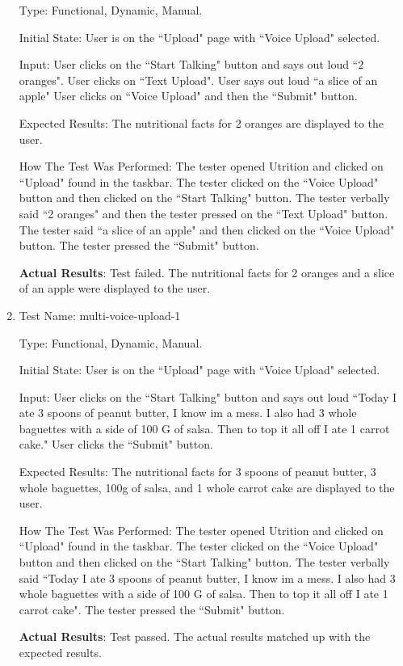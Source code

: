 \documentclass[12pt, titlepage]{article}
\begin{document}
\begin{enumerate}
		Type: Functional, Dynamic, Manual.
		
		Initial State: User is on the ``Upload" page with ``Voice Upload" selected.
		
		Input: User clicks on the ``Start Talking" button and says out loud ``2 oranges". User clicks on ``Text Upload". User says out loud ``a slice of an apple" User clicks on ``Voice Upload" and then the ``Submit" button.
		
		Expected Results: The nutritional facts for 2 oranges are displayed to the user.
		
		How The Test Was Performed: The tester opened Utrition and clicked on ``Upload" found in the taskbar. The tester clicked on the ``Voice Upload" button and then clicked on the ``Start Talking" button. The tester verbally said ``2 oranges" and then the tester pressed on the ``Text Upload" button. The tester said ``a slice of an apple" and then clicked on the ``Voice Upload" button. The tester pressed the ``Submit" button.
		
		\textbf{Actual Results}: Test failed. The nutritional facts for 2 oranges and a slice of an apple were displayed to the user.
		
		\item{Test Name: multi-voice-upload-1}
		
		Type: Functional, Dynamic, Manual.
		
		Initial State: User is on the ``Upload" page with ``Voice Upload" selected.
		
		Input: User clicks on the ``Start Talking" button and says out loud ``Today I ate 3 spoons of peanut butter, I know im a mess. I also had 3 whole baguettes with a side of 100 G of salsa. Then to top it all off I ate 1 carrot cake." User clicks the ``Submit" button.
		
		Expected Results: The nutritional facts for 3 spoons of peanut butter, 3 whole baguettes, 100g of salsa, and 1 whole carrot cake are displayed to the user.
		
		How The Test Was Performed: The tester opened Utrition and clicked on ``Upload" found in the taskbar. The tester clicked on the ``Voice Upload" button and then clicked on the ``Start Talking" button. The tester verbally said ``Today I ate 3 spoons of peanut butter, I know im a mess. I also had 3 whole baguettes with a side of 100 G of salsa. Then to top it all off I ate 1 carrot cake". The tester pressed the ``Submit" button.
		
		\textbf{Actual Results}: Test passed. The actual results matched up with the expected results.
		

\end{enumerate}
\end{document}
